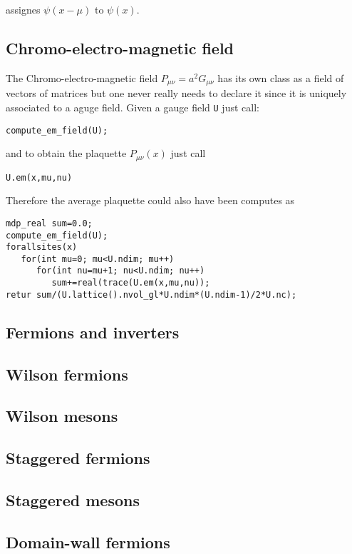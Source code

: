 assignes $\psi (x-\mu )$ to $\psi (x)$.

\subsection{Chromo-electro-magnetic field}

The Chromo-electro-magnetic field $P_{\mu \nu }=a^2G_{\mu \nu }$ has its own
class as a field of vectors of matrices but one never really needs to
declare it since it is uniquely associated to a aguge field. Given a gauge
field {\tt U} just call:
\begin{verbatim}
compute_em_field(U);
\end{verbatim}

and to obtain the plaquette $P_{\mu \nu }(x)$ just call
\begin{verbatim}
U.em(x,mu,nu)
\end{verbatim}

Therefore the average plaquette could also have been computes as
\begin{verbatim}
mdp_real sum=0.0;
compute_em_field(U);
forallsites(x)
   for(int mu=0; mu<U.ndim; mu++)
      for(int nu=mu+1; nu<U.ndim; nu++)
         sum+=real(trace(U.em(x,mu,nu));
retur sum/(U.lattice().nvol_gl*U.ndim*(U.ndim-1)/2*U.nc);
\end{verbatim}

\subsection{Fermions and inverters}

\subsection{Wilson fermions}

\subsection{Wilson mesons}

\subsection{Staggered fermions}

\subsection{Staggered mesons}

\subsection{Domain-wall fermions}

